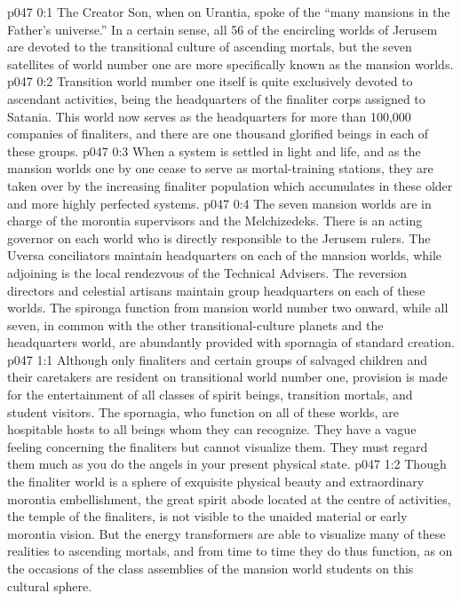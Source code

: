 \author{Brilliant Evening Star}
\vs p047 0:1 The Creator Son, when on Urantia, spoke of the “many mansions in the Father’s universe.” In a certain sense, all 56 of the encircling worlds of Jerusem are devoted to the transitional culture of ascending mortals, but the seven satellites of world number one are more specifically known as the mansion worlds.
\vs p047 0:2 Transition world number one itself is quite exclusively devoted to ascendant activities, being the headquarters of the finaliter corps assigned to Satania. This world now serves as the headquarters for more than 100,000 companies of finaliters, and there are one thousand glorified beings in each of these groups.
\vs p047 0:3 When a system is settled in light and life, and as the mansion worlds one by one cease to serve as mortal\hyp{}training stations, they are taken over by the increasing finaliter population which accumulates in these older and more highly perfected systems.
\vs p047 0:4 The seven mansion worlds are in charge of the morontia supervisors and the Melchizedeks. There is an acting governor on each world who is directly responsible to the Jerusem rulers. The Uversa conciliators maintain headquarters on each of the mansion worlds, while adjoining is the local rendezvous of the Technical Advisers. The reversion directors and celestial artisans maintain group headquarters on each of these worlds. The spironga function from mansion world number two onward, while all seven, in common with the other transitional\hyp{}culture planets and the headquarters world, are abundantly provided with spornagia of standard creation.
\vs p047 1:1 Although only finaliters and certain groups of salvaged children and their caretakers are resident on transitional world number one, provision is made for the entertainment of all classes of spirit beings, transition mortals, and student visitors. The spornagia, who function on all of these worlds, are hospitable hosts to all beings whom they can recognize. They have a vague feeling concerning the finaliters but cannot visualize them. They must regard them much as you do the angels in your present physical state.
\vs p047 1:2 Though the finaliter world is a sphere of exquisite physical beauty and extraordinary morontia embellishment, the great spirit abode located at the centre of activities, the temple of the finaliters, is not visible to the unaided material or early morontia vision. But the energy transformers are able to visualize many of these realities to ascending mortals, and from time to time they do thus function, as on the occasions of the class assemblies of the mansion world students on this cultural sphere.
